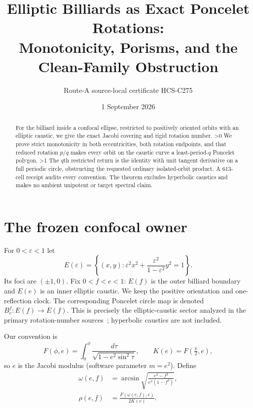 \documentclass[10pt]{article}
\title{Elliptic Billiards as Exact Poncelet Rotations:\\
Monotonicity, Porisms, and the Clean-Family Obstruction}
\author{Route-A source-local certificate HCS-C275}
\date{1 September 2026}
\providecommand{\CRevisionRound}{2}
\begin{document}
\maketitle
\begin{abstract}
For the billiard inside a confocal ellipse, restricted to positively oriented
orbits with an elliptic caustic, we give the exact Jacobi covering and rigid
rotation number.
\ifnum\CRevisionRound>0 We prove strict monotonicity in both eccentricities,
both rotation endpoints, and that reduced rotation $p/q$ makes every orbit on
the caustic curve a least-period-$q$ Poncelet polygon.
\fi\space
\ifnum\CRevisionRound>1 The $q$th restricted return is the identity with unit
tangent derivative on a full periodic circle, obstructing the requested
ordinary isolated-orbit product.  A 613-cell receipt audits every convention.
\fi\space
The theorem excludes hyperbolic caustics and makes no ambient unipotent or
target spectral claim.
\end{abstract}

\section{The frozen confocal owner}
For $0<\varepsilon<1$ let
\[
 E(\varepsilon)=\left\{(x,y):\varepsilon^2x^2+
 \frac{\varepsilon^2}{1-\varepsilon^2}y^2=1\right\}.
\]
Its foci are $(\pm1,0)$.  Fix $0<f<e<1$: $E(f)$ is the outer
billiard boundary and $E(e)$ is an inner elliptic caustic.  We keep the
positive orientation and one-reflection clock.  The corresponding Poncelet
circle map is denoted $B_e^f:E(f)\to E(f)$.  This is precisely the
elliptic-caustic sector analyzed in the primary rotation-number
sources~\cite{LM,Kol,CF}; hyperbolic caustics are not included.

Our convention is
\[
 F(\phi,e)=\int_0^\phi\frac{d\tau}{\sqrt{1-e^2\sin^2\tau}},
 \qquad K(e)=F(\tfrac\pi2,e),
\]
so $e$ is the Jacobi modulus (software parameter $m=e^2$).  Define
\begin{align}
 \omega(e,f)&=\arcsin\sqrt{\frac{e^2-f^2}{e^2(1-f^2)}},\label{eq:omega}\\
 \rho(e,f)&=\frac{F(\omega(e,f),e)}{2K(e)}.\label{eq:rho}
\end{align}
\end{document}
